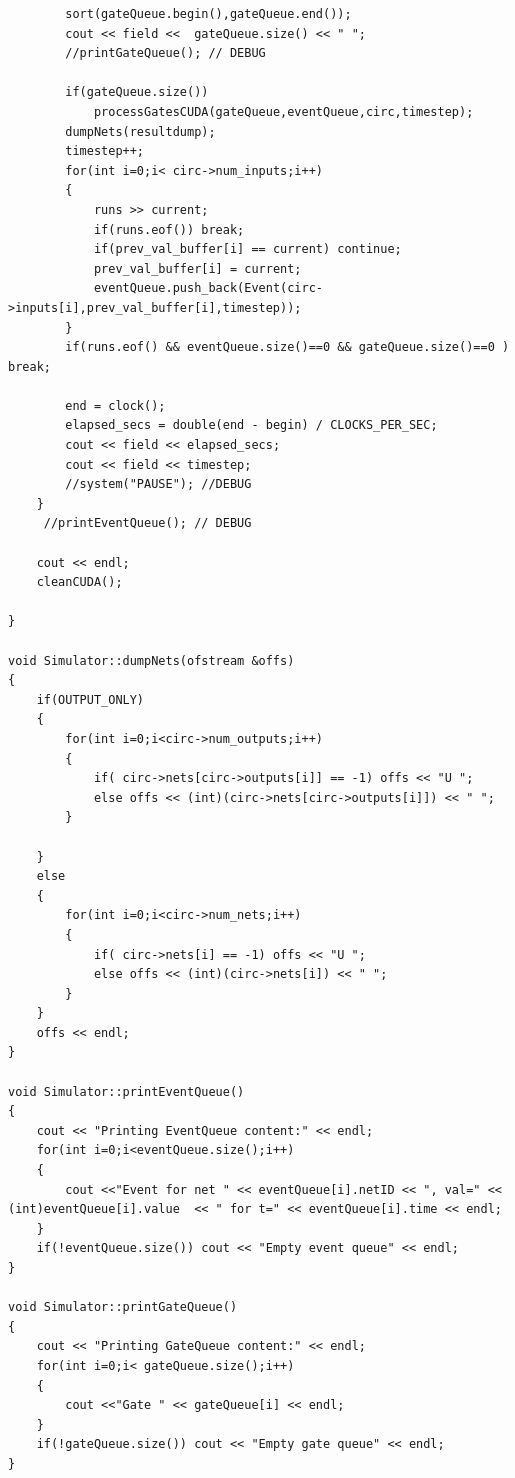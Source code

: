 \documentclass[a4paper,onesided,12pt]{report}
\begin{document}
\begin{verbatim}
		sort(gateQueue.begin(),gateQueue.end());
		cout << field <<  gateQueue.size() << " ";
		//printGateQueue(); // DEBUG

		if(gateQueue.size()) 
			processGatesCUDA(gateQueue,eventQueue,circ,timestep);
		dumpNets(resultdump);
		timestep++;
		for(int i=0;i< circ->num_inputs;i++)
		{
			runs >> current;
			if(runs.eof()) break;
			if(prev_val_buffer[i] == current) continue;
			prev_val_buffer[i] = current;
			eventQueue.push_back(Event(circ->inputs[i],prev_val_buffer[i],timestep));
		}
		if(runs.eof() && eventQueue.size()==0 && gateQueue.size()==0 ) break;

		end = clock();
		elapsed_secs = double(end - begin) / CLOCKS_PER_SEC;
		cout << field << elapsed_secs; 
		cout << field << timestep;
		//system("PAUSE"); //DEBUG
	}
	 //printEventQueue(); // DEBUG

	cout << endl;
	cleanCUDA();

}

void Simulator::dumpNets(ofstream &offs)
{
	if(OUTPUT_ONLY)
	{
		for(int i=0;i<circ->num_outputs;i++)
		{
			if( circ->nets[circ->outputs[i]] == -1) offs << "U ";
			else offs << (int)(circ->nets[circ->outputs[i]]) << " ";
		}
		
	}
	else
	{
		for(int i=0;i<circ->num_nets;i++)
		{
			if( circ->nets[i] == -1) offs << "U ";
			else offs << (int)(circ->nets[i]) << " ";
		}
	}
	offs << endl;
}

void Simulator::printEventQueue()
{
	cout << "Printing EventQueue content:" << endl;
	for(int i=0;i<eventQueue.size();i++)
	{
		cout <<"Event for net " << eventQueue[i].netID << ", val=" << (int)eventQueue[i].value  << " for t=" << eventQueue[i].time << endl;
	}
	if(!eventQueue.size()) cout << "Empty event queue" << endl;
}

void Simulator::printGateQueue()
{
	cout << "Printing GateQueue content:" << endl;
	for(int i=0;i< gateQueue.size();i++)
	{
		cout <<"Gate " << gateQueue[i] << endl;
	}
	if(!gateQueue.size()) cout << "Empty gate queue" << endl;
}








\end{verbatim}
\end{document}
